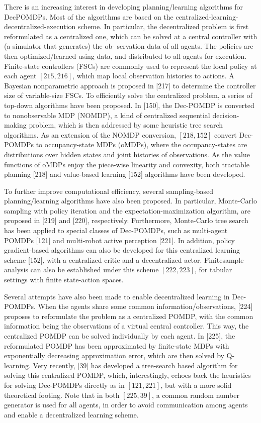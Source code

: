\documentclass[10pt]{article}
\begin{document}
There is an increasing interest in developing planning/learning algorithms for DecPOMDPs. Most of the algorithms are based on the centralized-learning-decentralized-execution scheme. In particular, the decentralized problem is first reformulated as a centralized one, which can be solved at a central controller with (a simulator that generates) the ob- servation data of all agents. The policies are then optimized/learned using data, and distributed to all agents for execution. Finite-state controllers (FSCs) are commonly used to represent the local policy at each agent $[215,216]$, which map local observation histories to actions. A Bayesian nonparametric approach is proposed in [217] to determine the controller size of variable-size FSCs. To efficiently solve the centralized problem, a series of top-down algorithms have been proposed. In [150], the Dec-POMDP is converted to nonobservable MDP (NOMDP), a kind of centralized sequential decision-making problem, which is then addressed by some heuristic tree search algorithms. As an extension of the NOMDP conversion, $[218,152]$ convert Dec-POMDPs to occupancy-state MDPs (oMDPs), where the occupancy-states are distributions over hidden states and joint histories of observations. As the value functions of oMDPs enjoy the piece-wise linearity and convexity, both tractable planning [218] and value-based learning [152] algorithms have been developed.

To further improve computational efficiency, several sampling-based planning/learning algorithms have also been proposed. In particular, Monte-Carlo sampling with policy iteration and the expectation-maximization algorithm, are proposed in [219] and [220], respectively. Furthermore, Monte-Carlo tree search has been applied to special classes of Dec-POMDPs, such as multi-agent POMDPs [121] and multi-robot active perception [221]. In addition, policy gradient-based algorithms can also be developed for this centralized learning scheme [152], with a centralized critic and a decentralized actor. Finitesample analysis can also be established under this scheme $[222,223]$, for tabular settings with finite state-action spaces.

Several attempts have also been made to enable decentralized learning in Dec-POMDPs. When the agents share some common information/observations, [224] proposes to reformulate the problem as a centralized POMDP, with the common information being the observations of a virtual central controller. This way, the centralized POMDP can be solved individually by each agent. In [225], the reformulated POMDP has been approximated by finite-state MDPs with exponentially decreasing approximation error, which are then solved by Q-learning. Very recently, [39] has developed a tree-search based algorithm for solving this centralized POMDP, which, interestingly, echoes back the heuristics for solving Dec-POMDPs directly as in $[121,221]$, but with a more solid theoretical footing. Note that in both $[225,39]$, a common random number generator is used for all agents, in order to avoid communication among agents and enable a decentralized learning scheme.
\end{document}

